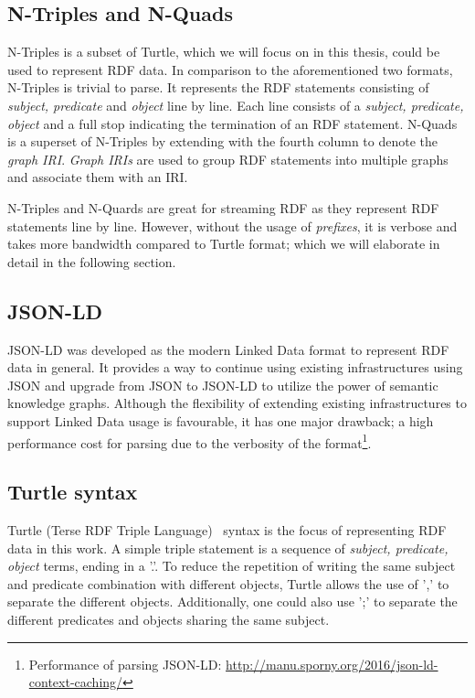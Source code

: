 \subsection{N-Triples and N-Quads}
N-Triples\cite{N-Triples} is a subset of Turtle, which we will focus on in this thesis, could be used 
to represent RDF data. In comparison to the aforementioned two formats, N-Triples is trivial to parse. 
It represents the RDF statements consisting of \emph{subject, predicate} and \emph{object} line by line. 
Each line consists of a \emph{subject, predicate, object} and a full stop indicating the termination of 
an RDF statement. N-Quads is a superset  of N-Triples by extending with the fourth column to denote the \emph{graph IRI}.
\emph{Graph IRIs} are used to group RDF statements into multiple graphs and associate them with an IRI.  

N-Triples and N-Quards are great for streaming RDF as they 
represent RDF statements line by line. However, without the usage of \emph{prefixes}, it is verbose and takes more 
bandwidth compared to Turtle format; which we will elaborate in detail in the following section.


\subsection{JSON-LD}
JSON-LD\cite{JSON-LD} was developed as 
the modern Linked Data format to represent RDF data in general. 
It provides a way to continue using existing 
infrastructures using JSON and upgrade from JSON to JSON-LD to utilize the power of semantic knowledge graphs. 
Although the flexibility of extending existing infrastructures to support Linked Data usage 
is favourable, it has one major drawback; a high performance cost for parsing due to 
the verbosity of the format\footnote{Performance of parsing JSON-LD: \url{http://manu.sporny.org/2016/json-ld-context-caching/}}.


\subsection{Turtle syntax}
\label{sec:turtle_syntax}
Turtle (Terse RDF Triple Language)~\cite{turtle_syntax}
syntax is the focus of representing RDF data in this work.
 A simple triple statement is a sequence of
\textit{subject, predicate, object} terms, ending in a '.'.
To reduce the repetition of writing the same subject and predicate combination with
different objects, Turtle allows the use of ',' to separate the different objects.
Additionally, one could also use ';' to separate the different predicates and objects sharing the
same subject. 


